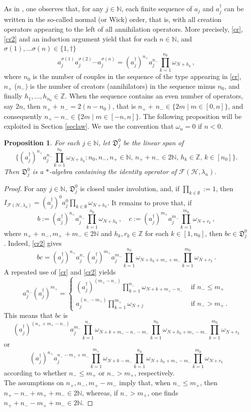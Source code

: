 \documentclass[12pt]{amsart}
\numberwithin{equation}{section}
\def\cf{{\mathcal F}}
\def\ch{{\mathcal H}}
\def\gd{{\mathfrak D}}
\def\bn{{\mathbb N}}
\def\bz{{\mathbb Z}}
\def\l{\lambda} \def\L{\Lambda}
\def\s{\sigma} \def\S{\Sigma}
\def\om{\omega} \def\Om{\Omega}
\newtheorem{prop}[thm]{Proposition}
\theoremstyle{definition}
\begin{document}
As in \cite{AHL2}, one observes that, for any $j\in\bn$, each finite sequence of $a_j$ and $a_j^\dag$ can be written in the so-called normal (or Wick) order, that is, with all creation operators appearing to the left of all annihilation operators. More precisely, \eqref{cr}, \eqref{cr2} and an induction argument yield that for each $n\in\bn$, and $\s(1),\ldots \s(n)\in\{1,\dag\}$
\begin{equation*}
a_j^{\s(1)}a_j^{\s(2)}\cdots a_j^{\s(n)}=(a_j^\dag)^{n_+}a_j^{n_-}\prod_{k=1}^{n_0}\om_{N+h_k}\,,
\end{equation*}
where $n_0$ is the number of couples in the sequence of the type appearing in \eqref{cr}, $n_+$ ($n_-$) is the number of creators (annihilators) in the sequence minus $n_0$, and finally $h_1,\ldots, h_{n_0}\in\bz$. When the sequence contains an even number of operators, say $2n$, then $n_++\,n_-=2(n-n_0)$, that is $n_+ +\,n_-\in\{2m\mid m\in[0,n]\}$, and consequently $n_+-n_-\in\{2m \mid m\in[-n,n]\}$. The following proposition will be exploited in Section \ref{seclaw}.
We use the convention that $\omega_n=0$ if $n<0$.
\begin{prop}\label{free1}
For each $j\in\bn$, let $\gd^0_j$ be the linear span of
$$
\bigg\{(a_j^\dag)^{n_+}a_j^{n_-}\prod_{k=1}^{n_0}\om_{N+h_k} :n_0,n_-,n_+\in\bn,\, n_++n_-\in 2\bn,\, h_k\in\bz,\, k\in [n_0]\bigg\}.
$$
Then $\gd^0_j$ is a $*$-algebra containing the identity operator of $\cf(\ch,\l_n)$.
\end{prop}
\begin{proof}
For any $j\in\bn$, $\gd^0_j$ is closed under involution, and, if $\prod_{k\in\emptyset}:=1$, then $\displaystyle{I_{\cf(\ch,\l_n)}=(a_j^\dag)^{0}a_j^{0}\prod_{k\in\emptyset}\om_{N+h_k}}$. It remains to prove that, if
$$
b:=(a_j^\dag)^{n_+}a_j^{n_-}\prod_{k=1}^{n_0}\om_{N+h_k}\,, \quad c:=(a_j^\dag)^{m_+}a_j^{m_-}\prod_{k=1}^{m_0}\om_{N+r_k}\,,
$$
where $n_++\,n_-, m_+\,+m_-\in 2\bn$ and $h_k,  r_k\in\bz$ for each $k\in [1,n_0]$, then $bc\in\gd^0_j$. Indeed, \eqref{cr2} gives
$$
bc=(a_j^\dag)^{n_+}a_j^{n_-}(a_j^\dag)^{m_+}a_j^{m_-}\prod_{k=1}^{n_0}\om_{N+h_k+m_++m_-}\prod_{k=1}^{m_0}\om_{N+r_k}\,.
$$
A repeated use of \eqref{cr} and \eqref{cr2} yields
$$
a_j^{n_-} (a_j^\dag)^{m_+}=\begin{cases}
\displaystyle{(a_j^\dag)^{(m_+-n_-)}\prod_{k=1}^{n_-}\om_{N+k+m_+-n_-}}
&\text{ if }n_-\leq m_+\\
\displaystyle{a_j^{(n_--m_+)}\prod_{k=1}^{m_+}\om_{N+j}}
&\text{ if }n_->m_+\,.
\end{cases}
$$
This means that $bc$ is
$$
\displaystyle{(a_j^\dag)^{(n_++m_+-n_-)}a_j^{m_-}
\prod_{k=1}^{n_-}\om_{N+k+m_+-n_--m_-}
\prod_{k=1}  ^{n_0} \om_{N+h_k+m_+-m_-}\prod_{k=1}  ^{m_0} \om_{N+r_k}}
$$
or
$$
\displaystyle{(a_j^\dag)^{n_+}a_j^{n_--m_++m_-}
\prod_{k=1}^{m_+}\om_{N+k-m_-}
\prod_{k=1}^{n_0} \om_{N+h_k+m_+-m_-}\prod_{k=1}  ^{m_0} \om_{N+r_k}}
$$
according to whether $n_-\leq m_+$ or $n_->m_+$, respectively.\\ The assumptions on $n_+,n_-,m_+-m_-$ imply that, when $n_-\leq m_+$, then $n_+-n_-+m_++m_-\in 2\bn$, whereas, if $n_->m_+$, one finds $n_++n_--m_++m_-\in 2\bn$.
\end {proof}
\end{document}
